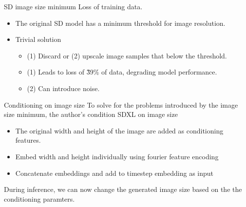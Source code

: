 \documentclass[8pt]{beamer}
\begin{document}
\begin{frame}{SD image size minimum}
    Loss of training data.
    \begin{itemize}
        \item The original SD model has a minimum threshold for image resolution.
        \item Trivial solution
        \begin{itemize}
            \item (1) Discard or (2) upscale image samples that below the threshold.
            \item (1) Leads to loss of \~39\% of data, degrading model performance.
            \item (2) Can introduce noise.
        \end{itemize}
    \end{itemize}
\end{frame}



\begin{frame}{Conditioning on image size}
    To solve for the problems introduced by the image size minimum, the author's condition SDXL on image size
    \begin{itemize}
        \item The original width and height of the image are added as conditioning features.
        \item Embed width and height individually using fourier feature encoding
        \item Concatenate embeddings and add to timestep embedding as input
    \end{itemize}
    \vspace{0.3cm}
    During inference, we can now change the generated image size based on the the conditioning paramters.
\end{frame}
\end{document}
